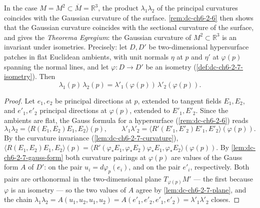 \begin{remark}
  \label{rem:dc-ch6-2-7}
  \leanok
  In the case $M=M^2\subset\overline{M}=\mathbb{R}^3$, the product $\lambda_1\lambda_2$
  of the principal curvatures coincides with the Gaussian curvature of the surface.
  \cref{rem:dc-ch6-2-6} then shows that the Gaussian curvature coincides with the sectional
  curvature of the surface, and gives the \emph{Theorema Egregium}:
  the Gaussian curvature of $M^2\subset\mathbb{R}^3$ is an invariant under
  isometries. Precisely: let $D,D'$ be two-dimensional hypersurface patches in
  flat Euclidean ambients, with unit normals $\eta$ at $p$ and $\eta'$ at
  $\varphi(p)$ spanning the normal lines, and let $\varphi:D\to D'$ be an
  isometry (\cref{def:dc-ch6-2-7-isometry}). Then
  $$
  \lambda_1(p)\,\lambda_2(p)=\lambda'_1(\varphi(p))\,\lambda'_2(\varphi(p)).
  $$
\end{remark}
\begin{proof}
  \leanok
  \sketch
  Let $e_1,e_2$ be principal directions at $p$, extended to tangent fields
  $E_1,E_2$, and $e'_1,e'_2$ principal directions at $\varphi(p)$, extended to
  $E'_1,E'_2$. Since the ambients are flat, the Gauss formula for a
  hypersurface (\cref{rem:dc-ch6-2-6}) reads
  $$
  \lambda_1\lambda_2=\langle R(E_1,E_2)E_1,E_2\rangle(p),
  \qquad
  \lambda'_1\lambda'_2=\langle R'(E'_1,E'_2)E'_1,E'_2\rangle(\varphi(p)).
  $$
  By the curvature invariance (\cref{lem:dc-ch6-2-7-curvature}),
  $\langle R(E_1,E_2)E_1,E_2\rangle(p)
    =\langle R'(\varphi_*E_1,\varphi_*E_2)\varphi_*E_1,\varphi_*E_2\rangle(\varphi(p))$.
  By \cref{lem:dc-ch6-2-7-gauss-form} both curvature pairings at
  $\varphi(p)$ are values of the Gauss form $A$ of $D'$: on the pair
  $u_i=d\varphi_p(e_i)$, and on the pair $e'_i$, respectively. Both pairs are
  orthonormal in the two-dimensional plane $T_{\varphi(p)}M'$ — the first
  because $\varphi$ is an isometry — so the two values of $A$ agree by
  \cref{lem:dc-ch6-2-7-plane}, and the chain
  $\lambda_1\lambda_2
    =A(u_1,u_2,u_1,u_2)=A(e'_1,e'_2,e'_1,e'_2)=\lambda'_1\lambda'_2$
  closes.
\end{proof}


